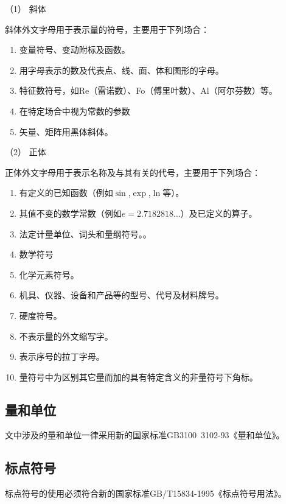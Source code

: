 （1） 斜体

斜体外文字母用于表示量的符号，主要用于下列场合：

\begin{enumerate}[label=\circled{\arabic*}]
\item 变量符号、变动附标及函数。
\item 用字母表示的数及代表点、线、面、体和图形的字母。
\item 特征数符号，如Re（雷诺数）、Fo（傅里叶数）、Al（阿尔芬数）等。
\item 在特定场合中视为常数的参数
\item 矢量、矩阵用黑体斜体。
\end{enumerate}

（2） 正体

正体外文字母用于表示名称及与其有关的代号，主要用于下列场合：

\begin{enumerate}[label=\circled{\arabic*}]
\item 有定义的已知函数（例如$\sin$,$\exp$,$\ln$等）。
\item 其值不变的数学常数（例如$e=2.718 281 8…$）及已定义的算子。
\item 法定计量单位、词头和量纲符号。。
\item 数学符号
\item 化学元素符号。
\item 机具、仪器、设备和产品等的型号、代号及材料牌号。
\item 硬度符号。
\item 不表示量的外文缩写字。
\item 表示序号的拉丁字母。
\item 量符号中为区别其它量而加的具有特定含义的非量符号下角标。
\end{enumerate}

\subsection{量和单位}
文中涉及的量和单位一律采用新的国家标准GB3100~3102-93《量和单位》。

\subsection{标点符号}
标点符号的使用必须符合新的国家标准GB/T15834-1995《标点符号用法》。

